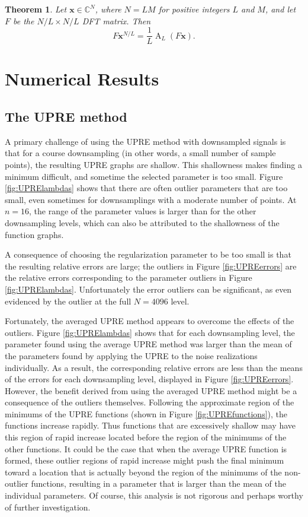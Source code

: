 \documentclass[12pt]{article}
\DeclareMathOperator{\alias}{A}	%
\newtheorem{theorem}{Theorem}[section]
\begin{document}
\begin{theorem}
\label{thm:Downsampling thm}
Let $\mathbf{x} \in \mathbb{C}^N$, where $N = LM$ for positive integers $L$ and $M$, and let $F$ be the $N/L \times N/L$ DFT matrix. Then
\[F\mathbf{x}^{N/L} = \frac{1}{L}\alias_L(F\mathbf{x}).\]
\end{theorem}


\section{Numerical Results} \label{Numerical results}

\subsection{The UPRE method} \label{The UPRE method}
A primary challenge of using the UPRE method with downsampled signals is that for a course downsampling (in other words, a small number of sample points), the resulting UPRE graphs are shallow. This shallowness makes finding a minimum difficult, and sometime the selected parameter is too small. Figure \ref{fig:UPRElambdas} shows that there are often outlier parameters that are too small, even sometimes for downsamplings with a moderate number of points. At $n = 16$, the range of the parameter values is larger than for the other downsampling levels, which can also be attributed to the shallowness of the function graphs. \par 
A consequence of choosing the regularization parameter to be too small is that the resulting relative errors are large; the outliers in Figure \ref{fig:UPREerrors} are the relative errors corresponding to the parameter outliers in Figure \ref{fig:UPRElambdas}. Unfortunately the error outliers can be significant, as even evidenced by the outlier at the full $N = 4096$ level. \par 
Fortunately, the averaged UPRE method appears to overcome the effects of the outliers. Figure \ref{fig:UPRElambdas} shows that for each downsampling level, the parameter found using the average UPRE method was larger than the mean of the parameters found by applying the UPRE to the noise realizations individually. As a result, the corresponding relative errors are less than the means of the errors for each downsampling level, displayed in Figure \ref{fig:UPREerrors}. However, the benefit derived from using the averaged UPRE method might be a consequence of the outliers themselves. Following the approximate region of the minimums of the UPRE functions (shown in Figure \ref{fig:UPREfunctions}), the functions increase rapidly. Thus functions that are excessively shallow may have this region of rapid increase located before the region of the minimums of the other functions. It could be the case that when the average UPRE function is formed, these outlier regions of rapid increase might push the final minimum toward a location that is actually beyond the region of the minimums of the non-outlier functions, resulting in a parameter that is larger than the mean of the individual parameters. Of course, this analysis is not rigorous and perhaps worthy of further investigation. 
\end{document}
